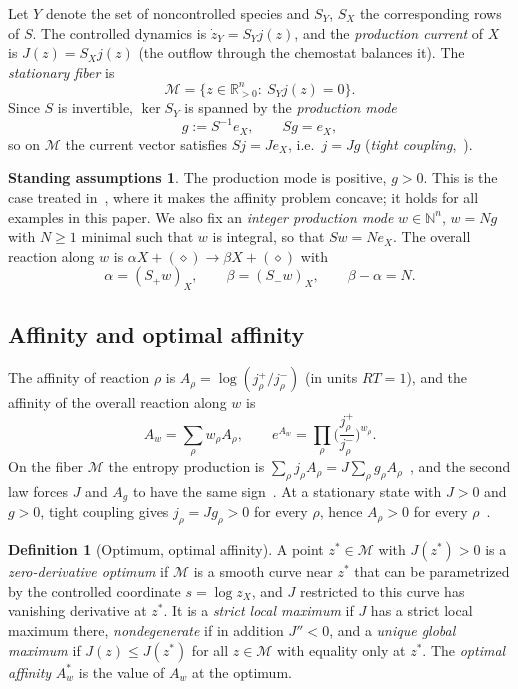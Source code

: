 \documentclass[11pt,reqno]{amsart}
\theoremstyle{plain}
\theoremstyle{definition}
\newtheorem{definition}[theorem]{Definition}
\newtheorem{assumption}[theorem]{Standing assumptions}
\theoremstyle{remark}
\numberwithin{equation}{section}
\newcommand{\R}{\mathbb{R}}
\newcommand{\N}{\mathbb{N}}
\newcommand{\Ker}{\operatorname{ker}}
\newcommand{\Sp}{S_{+}}
\newcommand{\Sm}{S_{-}}
\begin{document}
Let $Y$ denote the set of noncontrolled species and $S_Y$, $S_X$ the corresponding rows of $S$.  The controlled dynamics is $\dot z_Y=S_Yj(z)$, and the \emph{production current} of $X$ is $J(z)=S_Xj(z)$ (the outflow through the chemostat balances it).  The \emph{stationary fiber} is
\[
\mathcal M=\{z\in\R^n_{>0}:\ S_Yj(z)=0\}.
\]
Since $S$ is invertible, $\Ker S_Y$ is spanned by the \emph{production mode}
\begin{equation}\label{eq:mode}
g:=S^{-1}e_X,\qquad Sg=e_X,
\end{equation}
so on $\mathcal M$ the current vector satisfies $Sj=Je_X$, i.e.\ $j=Jg$ (\emph{tight coupling},~\cite[Eq.~(21)]{DDL24}).

\begin{assumption}\label{ass:positive}
The production mode is positive, $g>0$.  This is the case treated in~\cite[Supplementary Note~11]{DDL24}, where it makes the affinity problem concave; it holds for all examples in this paper.  We also fix an \emph{integer production mode} $w\in\N^n$, $w=Ng$ with $N\ge1$ minimal such that $w$ is integral, so that $Sw=Ne_X$.  The overall reaction along $w$ is $\alpha X+(\diamond)\to\beta X+(\diamond)$ with
\begin{equation}\label{eq:alphabeta}
\alpha=(\Sp w)_X,\qquad\beta=(\Sm w)_X,\qquad\beta-\alpha=N.
\end{equation}
\end{assumption}

\subsection{Affinity and optimal affinity}
The affinity of reaction $\rho$ is $A_\rho=\log(j^+_\rho/j^-_\rho)$ (in units $RT=1$), and the affinity of the overall reaction along $w$ is
\begin{equation}\label{eq:affinity}
A_w=\sum_\rho w_\rho A_\rho,\qquad e^{A_w}=\prod_\rho\Big(\frac{j^+_\rho}{j^-_\rho}\Big)^{w_\rho}.
\end{equation}
On the fiber $\mathcal M$ the entropy production is $\sum_\rho j_\rho A_\rho=J\sum_\rho g_\rho A_\rho$~\cite{PE14,RE16}, and the second law forces $J$ and $A_g$ to have the same sign~\cite[Eqs.~(24)--(25)]{DDL24}.  At a stationary state with $J>0$ and $g>0$, tight coupling gives $j_\rho=Jg_\rho>0$ for every $\rho$, hence $A_\rho>0$ for every $\rho$~\cite[Eq.~(39)]{DDL24}.

\begin{definition}[Optimum, optimal affinity]\label{def:optimum}
A point $z^*\in\mathcal M$ with $J(z^*)>0$ is a \emph{zero-derivative optimum} if $\mathcal M$ is a smooth curve near $z^*$ that can be parametrized by the controlled coordinate $s=\log z_X$, and $J$ restricted to this curve has vanishing derivative at $z^*$.  It is a \emph{strict local maximum} if $J$ has a strict local maximum there, \emph{nondegenerate} if in addition $J''<0$, and a \emph{unique global maximum} if $J(z)\le J(z^*)$ for all $z\in\mathcal M$ with equality only at $z^*$.  The \emph{optimal affinity} $A^*_w$ is the value of $A_w$ at the optimum.
\end{definition}
\end{document}

